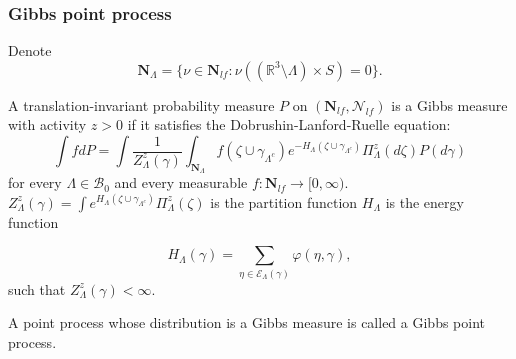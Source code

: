 \documentclass[c, 10pt]{beamer}
\begin{document}
\begin{frame}\frametitle{Gibbs point process}

{\small
Denote
	$$\mathbf N_\Lambda = \{ \nu \in \mathbf N_{lf}: \nu( (\mathbb R^3 \setminus \Lambda) \times S) = 0 \}.$$

	A translation-invariant probability measure $P$ on $(\mathbf N_{lf}, \mathcal N_{lf})$ is a \alert{Gibbs measure} with activity $z>0$ if it satisfies the \alert{Dobrushin-Lanford-Ruelle} equation:
	\begin{equation*}
		\int f dP = \int \frac 1 {Z^z_{\Lambda}(\gamma)} \int_{\mathbf N_\Lambda} f(\zeta \cup \gamma_{\Lambda^c}) e^{-H_{\Lambda}(\zeta \cup \gamma_{\Lambda^c})} \Pi^z_\Lambda (d\zeta) P(d\gamma)
	\end{equation*}
	for every $\Lambda \in \mathcal B_0$ and every measurable $f:\mathbf N_{lf} \to [0,\infty)$. \newline 
	$Z^z_{\Lambda}(\gamma) = \int e^{H_\Lambda (\zeta \cup \gamma_{\Lambda^c})} \Pi^z_\Lambda(\zeta)$ is the \alert{partition function} \newline
	$H_{\Lambda}$ is the \alert{energy function} 
	
	$$H_{\Lambda}(\gamma) = \sum_{\eta \in \mathcal E_\Lambda(\gamma)} \varphi(\eta, \gamma),$$
	such that $Z^z_\Lambda(\gamma) < \infty$. \newline

		A point process whose distribution is a Gibbs measure is called a \alert{Gibbs point process}.

	}



\end{frame}
\end{document}
